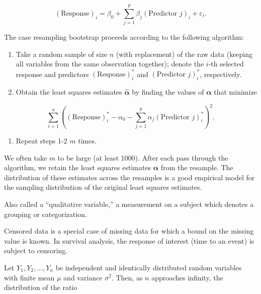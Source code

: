 \documentclass[
  letterpaper,
  DIV=11,
  numbers=noendperiod]{scrreprt}
\providecommand{\tightlist}{%
  \setlength{\itemsep}{0pt}\setlength{\parskip}{0pt}}\usepackage{longtable,booktabs,array}
\theoremstyle{definition}
\theoremstyle{definition}
\theoremstyle{remark}
\begin{document}
\[(\text{Response})_i = \beta_0 + \sum_{j=1}^{p} \beta_j (\text{Predictor } j)_i + \varepsilon_i.\]

The case resampling bootstrap proceeds according to the following
algorithm:

\begin{enumerate}
\def\labelenumi{\arabic{enumi}.}
\tightlist
\item
  Take a random sample of size \(n\) (with replacement) of the raw data
  (keeping all variables from the same observation together); denote the
  \(i\)-th selected response and predictors \((\text{Response})_i^*\)
  and \((\text{Predictor } j)_i^*\), respectively.
\item
  Obtain the least squares estimates \(\widehat{\boldsymbol{\alpha}}\)
  by finding the values of \(\boldsymbol{\alpha}\) that minimize
\end{enumerate}

\[\sum_{i=1}^{n} \left((\text{Response})_i^* - \alpha_0 - \sum_{j=1}^{p} \alpha_j (\text{Predictor } j)_i^*\right)^2.\]

\begin{enumerate}
\def\labelenumi{\arabic{enumi}.}
\setcounter{enumi}{2}
\tightlist
\item
  Repeat steps 1-2 \(m\) times.
\end{enumerate}

We often take \(m\) to be large (at least 1000). After each pass through
the algorithm, we retain the least squares estimates
\(\widehat{\boldsymbol{\alpha}}\) from the resample. The distribution of
these estimates across the resamples is a good empirical model for the
sampling distribution of the original least squares estimates.

\begin{description}
\tightlist
\item[Categorical Variable (Definition~\ref{def-categorical-variable})]
Also called a ``qualitative variable,'' a measurement on a subject which
denotes a grouping or categorization.
\item[Censored Data (Definition~\ref{def-censored-data})]
Censored data is a special case of missing data for which a bound on the
missing value is known. In survival analysis, the response of interest
(time to an event) is subject to censoring.
\item[Central Limit Theorem (Definition~\ref{def-clt})]
Let \(Y_1, Y_2, \dotsc, Y_n\) be independent and identically distributed
random variables with finite mean \(\mu\) and variance \(\sigma^2\).
Then, as \(n\) approaches infinity, the distribution of the ratio
\end{description}
\end{document}
